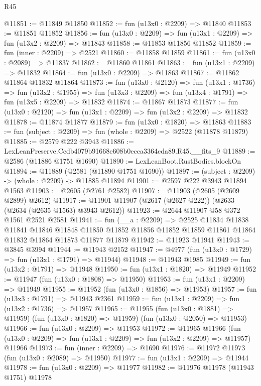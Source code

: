 \begin{lexlean}{R45}
\begin{coremodule}
@11851 := @11849 @11850
@11852 := fun (u13x0 : @2209) => @11840
@11853 := @11851 @11852
@11856 := fun (u13x0 : @2209) => fun (u13x1 : @2209) => fun (u13x2 : @2209) => @11843
@11858 := @11853 @11856 @11852
@11859 := fun (inner : @2209) => @2521
@11860 := @11858 @11859
@11861 := fun (u13x0 : @2089) => @11837
@11862 := @11860 @11861
@11863 := fun (u13x1 : @2209) => @11832
@11864 := fun (u13x0 : @2209) => @11863
@11867 := @11862 @11864 @11832 @11864
@11873 := fun (u13x0 : @2120) =>
  fun (u13x1 : @1736) =>
  fun (u13x2 : @1955) => fun (u13x3 : @2209) => fun (u13x4 : @1791) => fun (u13x5 : @2209) => @11832
@11874 := @11867 @11873
@11877 := fun (u13x0 : @2120) => fun (u13x1 : @2209) => fun (u13x2 : @2209) => @11832
@11878 := @11874 @11877
@11879 := fun (u13x0 : @1820) => @11863
@11883 := fun (subject : @2209) => fun (whole : @2209) => @2522 (@11878 @11879)
@11885 := @2579 @222 @3943
@11886 := LexLeanPreserve.Ccdb4079b91668e608b0ecca3364cda89.R45.__fits_9
@11889 := @2586 (@11886 @1751 @1690)
@11890 := LexLeanBoot.RustBodies.blockOn
@11894 := @11889 (@2581 (@11890 @1751 @1690))
@11897 := (subject : @2209) -> (whole : @2209) -> @11885 @11894
@11901 := @2597 @222 @3943 @11894 @1563
@11903 := @2605 (@2761 @2582)
@11907 := @11903 (@2605 (@2609 @2899) @2612)
@11917 := @11901 @11907 (@2617 (@2627 @222)) (@2633 (@2634 (@2635 @1563) @3943 @2612))
@11923 := @2644 @11907 @58 @372 @1561 @2521 @2581
@11941 := fun (__a : @2209) =>
  @2525
    @11834
    @11838
    @11841
    @11846
    @11848
    @11850
    @11852
    @11856
    @11852
    @11859
    @11861
    @11864
    @11832
    @11864
    @11873
    @11877
    @11879
@11942 := @11923 @11941
@11943 := @3845 @3994
@11944 := @11943 @2152
@11947 := @4977 (fun (u13x0 : @1729) => fun (u13x1 : @1791) => @11944)
@11948 := @11943 @1985
@11949 := fun (u13x2 : @1791) => @11948
@11950 := fun (u13x1 : @1820) => @11949
@11952 := @11947 (fun (u13x0 : @1808) => @11950)
@11953 := fun (u13x1 : @2209) => @11949
@11955 := @11952 (fun (u13x0 : @1856) => @11953)
@11957 := fun (u13x3 : @1791) => @11943 @2361
@11959 := fun (u13x1 : @2209) => fun (u13x2 : @1736) => @11957
@11965 := @11955
    (fun (u13x0 : @1881) => @11959)
    (fun (u13x0 : @1820) => @11959)
    (fun (u13x0 : @2050) => @11953)
@11966 := fun (u13x0 : @2209) => @11953
@11972 := @11965
    @11966
    (fun (u13x0 : @2209) => fun (u13x1 : @2209) => fun (u13x2 : @2209) => @11957)
    @11966
@11973 := fun (inner : @2209) => @1690
@11976 := @11972 @11973 (fun (u13x0 : @2089) => @11950)
@11977 := fun (u13x1 : @2209) => @11944
@11978 := fun (u13x0 : @2209) => @11977
@11982 := @11976 @11978 (@11943 @1751) @11978

\end{coremodule}
\end{lexlean}
